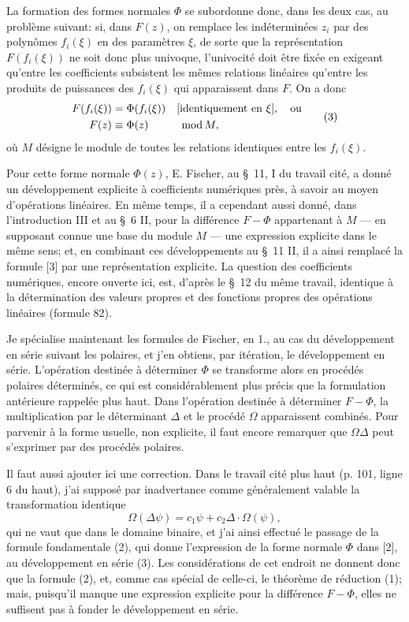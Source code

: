 La formation des formes normales $\Phi$ se subordonne donc, dans les deux cas, au problème suivant: si, dans $F(z)$, on remplace les indéterminées $z_i$ par des polynômes $f_i(\xi)$ en des paramètres $\xi$, de sorte que la représentation $F(f_i(\xi))$ ne soit donc plus univoque, l'univocité doit être fixée en exigeant qu'entre les coefficients subsistent les mêmes relations linéaires qu'entre les produits de puissances des $f_i(\xi)$ qui apparaissent dans $F$. On a donc
\begin{equation}
\begin{aligned}
        F(f_i(\xi))&=\Phi(f_i(\xi))&&[\text{identiquement en }\xi],\quad\text{ou}\notag\\
        F(z)&\equiv\Phi(z)&&\;\operatorname{mod} M,
\end{aligned}
\tag{3}
\end{equation}
où $M$ désigne le module de toutes les relations identiques entre les $f_i(\xi)$.

Pour cette forme normale $\Phi(z)$, E. Fischer, au \S~11, I du travail cité, a donné un développement explicite à coefficients numériques près, à savoir au moyen d'opérations linéaires. En même temps, il a cependant aussi donné, dans l'introduction III et au \S~6 II, pour la différence $F-\Phi$ appartenant à $M$ --- en supposant connue une base du module $M$ --- une expression explicite dans le même sens; et, en combinant ces développements au \S~11 II, il a ainsi remplacé la formule [3] par une représentation explicite. La question des coefficients numériques, encore ouverte ici, est, d'après le \S~12 du même travail, identique à la détermination des valeurs propres et des fonctions propres des opérations linéaires (formule 82).

Je spécialise maintenant les formules de Fischer, en 1., au cas du développement en série suivant les polaires, et j'en obtiens, par itération, le développement en série. L'opération destinée à déterminer $\Phi$ se transforme alors en procédés polaires déterminés, ce qui est considérablement plus précis que la formulation antérieure rappelée plus haut. Dans l'opération destinée à déterminer $F-\Phi$, la multiplication par le déterminant $\Delta$ et le procédé $\Omega$ apparaissent combinés. Pour parvenir à la forme usuelle, non explicite, il faut encore remarquer que $\Omega\Delta$ peut s'exprimer par des procédés polaires.

Il faut aussi ajouter ici une correction. Dans le travail cité plus haut (p. 101, ligne 6 du haut), j'ai supposé par inadvertance comme généralement valable la transformation identique
\[
        \Omega(\Delta\psi)=c_1\psi+c_2\Delta\cdot\Omega(\psi),
\]
qui ne vaut que dans le domaine binaire, et j'ai ainsi effectué le passage de la formule fondamentale (2), qui donne l'expression de la forme normale $\Phi$ dans [2], au développement en série (3). Les considérations de cet endroit ne donnent donc que la formule (2), et, comme cas spécial de celle-ci, le théorème de réduction (1); mais, puisqu'il manque une expression explicite pour la différence $F-\Phi$, elles ne suffisent pas à fonder le développement en série.

